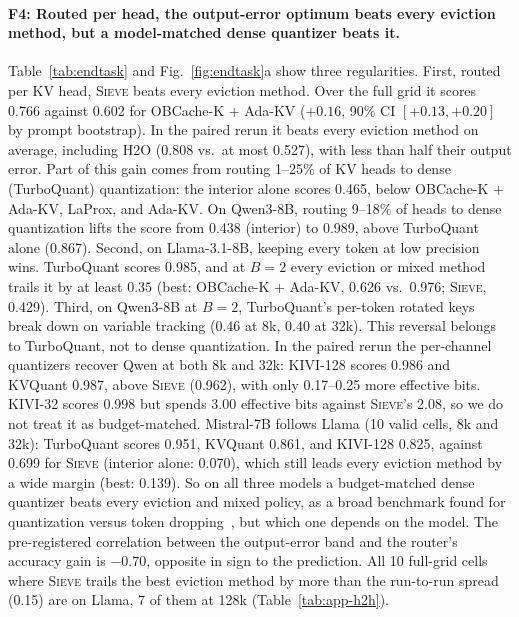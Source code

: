 \documentclass{article}
\newif\ifshowtbd \showtbdtrue
\newcommand{\tbd}[1]{\ifshowtbd{\color{tbdcol}\textbf{TBD}~#1}\else\ifhmode\unskip\fi\fi}
\newcommand{\sieve}{\textsc{Sieve}}
\theoremstyle{definition}
\begin{document}

\paragraph{F4: Routed per head, the output-error optimum beats every eviction method, but a model-matched dense quantizer beats it.}
Table~\ref{tab:endtask} and Fig.~\ref{fig:endtask}a show three regularities.  First, routed per KV head, \sieve{} beats every eviction method.  Over the full grid it scores 0.766 against 0.602 for OBCache-K + Ada-KV ($+0.16$, 90\% CI $[+0.13,+0.20]$ by prompt bootstrap).  In the paired rerun it beats every eviction method on average, including H2O (0.808 vs.\ at most 0.527), with less than half their output error.  Part of this gain comes from routing 1--25\% of KV heads to dense (TurboQuant) quantization: the interior alone scores 0.465, below OBCache-K + Ada-KV, LaProx, and Ada-KV.  On Qwen3-8B, routing 9--18\% of heads to dense quantization lifts the score from 0.438 (interior) to 0.989, above TurboQuant alone (0.867).  Second, on Llama-3.1-8B, keeping every token at low precision wins.  TurboQuant scores 0.985, and at $B=2$ every eviction or mixed method trails it by at least $0.35$ (best: OBCache-K + Ada-KV, 0.626 vs.\ 0.976; \sieve{}, 0.429).  Third, on Qwen3-8B at $B=2$, TurboQuant's per-token rotated keys break down on variable tracking ($0.46$ at 8k, $0.40$ at 32k).  This reversal belongs to TurboQuant, not to dense quantization.  In the paired rerun the per-channel quantizers recover Qwen at both 8k and 32k: KIVI-128 scores 0.986 and KVQuant 0.987, above \sieve{} (0.962), with only 0.17--0.25 more effective bits.  KIVI-32 scores 0.998 but spends 3.00 effective bits against \sieve{}'s 2.08, so we do not treat it as budget-matched.  Mistral-7B follows Llama (10 valid cells, 8k and 32k): TurboQuant scores 0.951, KVQuant 0.861, and KIVI-128 0.825, against 0.699 for \sieve{} (interior alone: 0.070), which still leads every eviction method by a wide margin (best: 0.139).  So on all three models a budget-matched dense quantizer beats every eviction and mixed policy, as a broad benchmark found for quantization versus token dropping~\citep{yuan2024kvbench}, but which one depends on the model.  The pre-registered correlation between the output-error band and the router's accuracy gain is $-0.70$, opposite in sign to the prediction.  All 10 full-grid cells where \sieve{} trails the best eviction method by more than the run-to-run spread (0.15) are on Llama, 7 of them at 128k (Table~\ref{tab:app-h2h}).
\end{document}
